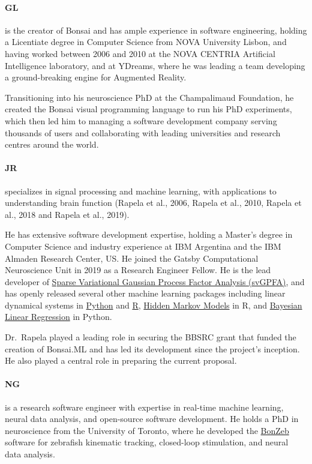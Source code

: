 \paragraph{GL} is the creator of Bonsai and has ample experience in software engineering, holding a Licentiate degree in Computer Science from NOVA University Lisbon, and having worked between 2006 and 2010 at the NOVA CENTRIA Artificial Intelligence laboratory, and at YDreams, where he was leading a team developing a ground-breaking engine for Augmented Reality.

Transitioning into his neuroscience PhD at the Champalimaud Foundation, he created the Bonsai visual programming language to run his PhD experiments, which then led him to managing a software development company serving thousands of users and collaborating with leading universities and research centres around the world.

\paragraph{JR} specializes in
signal processing and machine learning, with applications to understanding
brain function (Rapela et al., 2006, Rapela et al., 2010, Rapela et al., 2018
and Rapela et al., 2019).

He has extensive software development expertise, holding a Master’s degree in
Computer Science and industry experience at IBM Argentina and the IBM Almaden
Research Center, US.
%
He joined the Gatsby Computational Neuroscience Unit in 2019 as a Research
Engineer Fellow.
%
He is the lead developer of \href{https://github.com/joacorapela/svGPFA}{Sparse
Variational Gaussian Process Factor Analysis (svGPFA)}, and has openly released
several other machine learning packages including linear dynamical systems in
\href{https://github.com/joacorapela/ssm}{Python} and
\href{https://github.com/joacorapela/kalmanFilter}{R},
\href{https://github.com/joacorapela/hiddenMarkovModels}{Hidden Markov Models}
in R, and
\href{https://github.com/joacorapela/bayesianLinearRegression}{Bayesian Linear
Regression} in Python.

Dr.~Rapela played a leading role in securing the BBSRC grant that funded the
creation of Bonsai.ML and has led its development since the project’s
inception. He also played a central role in preparing the current proposal.

\paragraph{NG} is a research software engineer with expertise in real-time machine learning, neural data analysis, and open-source software development. He holds a PhD in neuroscience from the University of Toronto, where he developed the \href{https://ncguilbeault.github.io/BonZeb/}{BonZeb} software for zebrafish kinematic tracking, closed-loop stimulation, and neural data analysis.

